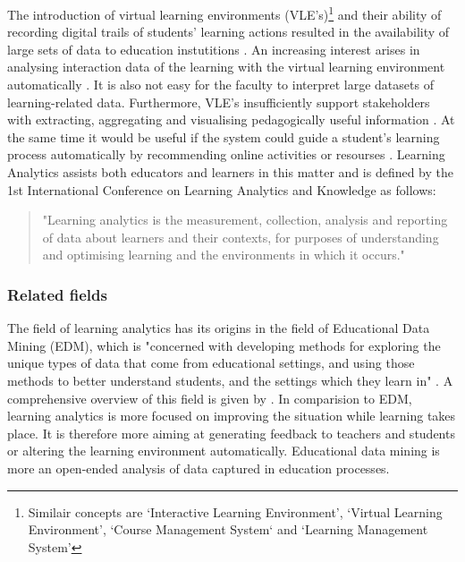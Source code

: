 \documentclass[11pt]{article}
\begin{document}
The introduction of virtual learning environments (VLE's)\footnote{Similair concepts are `Interactive Learning Environment', `Virtual Learning Environment', `Course Management System` and `Learning Management System'} and their ability of recording digital trails of students' learning actions resulted in the availability of large sets of data to education instutitions \cite{Ferguson2012a,Romero2007}. An increasing interest arises in analysing interaction data of the learning with the virtual learning environment automatically \cite{Muehlenbrock2005}. It is also not easy for the faculty to interpret large datasets of learning-related data. Furthermore, VLE's insufficiently support stakeholders with extracting, aggregating and visualising pedagogically useful information \cite{Zhang2007,Dawson2010,Zaiane2001}. At the same time it would be useful if the system could guide a student's learning process automatically by recommending online activities or resourses \cite{Zaiane2001}.
Learning Analytics assists both educators and learners in this matter and is defined by the 1st International Conference on Learning Analytics and Knowledge as follows:
\begin{quote}
"Learning analytics is the measurement, collection, analysis and reporting of data about learners and their contexts, for purposes of understanding and optimising learning and the environments in which it occurs." \cite{lak2011}
\end{quote}
\subsubsection{Related fields}
The field of learning analytics has its origins in the field of Educational Data Mining (EDM), which is "concerned with developing methods for exploring the unique types of data that come from educational settings, and using those methods to better understand students, and the settings which they learn in" \cite{Baker2009}. A comprehensive overview of this field is given by \cite{Romero2007}. In comparision to EDM, learning analytics is more focused on improving the situation while learning takes place. It is therefore more aiming at generating feedback to teachers and students or altering the learning environment automatically. Educational data mining is more an open-ended analysis of data captured in education processes. 
\end{document}
